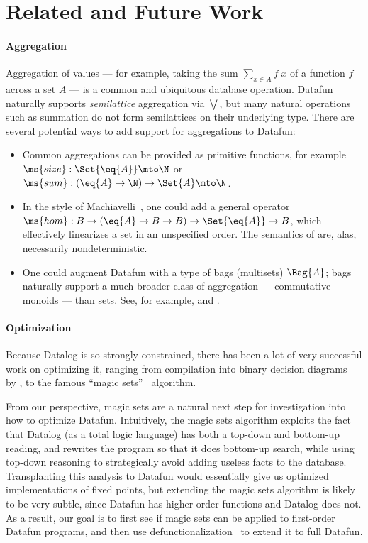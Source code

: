 \section{Related and Future Work}
\label{sec:futurework}

\paragraph{Aggregation}
Aggregation of values --- for example, taking the sum $\sum_{x \in A} f \;x$ of
a function $f$ across a set $A$ --- is a common and ubiquitous database
operation. Datafun naturally supports \emph{semilattice} aggregation via
$\bigvee$, but many natural operations such as summation do not form
semilattices on their underlying type. There are several potential ways to add
support for aggregations to Datafun:
\begin{itemize}
\item Common aggregations can be provided as primitive functions, for example
  $\ms{size} : \Set{\eq{A}} \mto \N$ or $\ms{sum} : (\eq{A} \to \N) \uto \Set{A}
  \mto \N$.

\item In the style of Machiavelli~\cite{machiavelli}, one could add a general
  operator $\ms{hom} : B \to (\eq{A} \uto B \uto B) \uto \Set{\eq{A}} \uto B$,
  which effectively linearizes a set in an unspecified order. The semantics of
   are, alas, necessarily nondeterministic.

\item One could augment Datafun with a type of bags (multisets) $\Bag{A}$; bags
  naturally support a much broader class of aggregation --- commutative monoids
  --- than sets. See, for example, \citet{multilinear-bigdata} and \citet{reladj}.
\end{itemize}

\paragraph{Optimization} Because Datalog is so strongly constrained,
there has been a lot of very successful work on optimizing it, ranging
from compilation into binary decision diagrams~\cite{bdd} by
\citet{whaley-lam}, to the famous ``magic sets''~\cite{magicsets}
algorithm.

From our perspective, magic sets are a natural next step for
investigation into how to optimize Datafun. Intuitively, the magic
sets algorithm exploits the fact that Datalog (as a total logic
language) has both a top-down and bottom-up reading, and rewrites the
program so that it does bottom-up search, while using top-down
reasoning to strategically avoid adding useless facts to the
database. Transplanting this analysis to Datafun would essentially
give us optimized implementations of fixed points, but extending the
magic sets algorithm is likely to be very subtle, since Datafun has
higher-order functions and Datalog does not. As a result, our goal is
to first see if magic sets can be applied to first-order Datafun programs,
and then use defunctionalization~\cite{defunctionalization} to
extend it to full Datafun.

